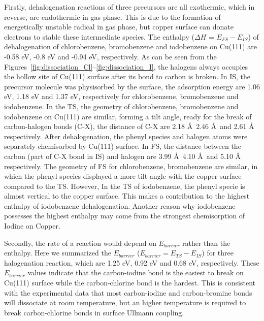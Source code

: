 \documentclass[%
 reprint,
 amsmath,amssymb,
 aps,
prb,
]{revtex4-2}
\begin{document}
Firstly, dehalogenation reactions of three precursors are all exothermic, which in reverse, are endothermic in gas phase. This is due to the formation of energetically unstable radical in gas phase, but copper surface can donate electrons to stable these intermediate species.
The enthalpy ($\Delta H$ = $E_{FS} - E_{IS}$) of dehalogenation of chlorobenzene, bromobenzene and iodobenzene on Cu(111) are -0.58 eV, -0.8 eV and -0.94 eV, respectively. As can be seen from the Figures~\ref{fig:dissociation_Cl}--\ref{fig:dissociation_I}, the halogens always occupies the hollow site of Cu(111) surface after its bond to carbon is broken. 
In IS, the precursor molecule was physisorbed by the surface, the adsorption energy are 1.06 eV, 1.18 eV and 1.37 eV, respectively for chlorobenzene, bromobenzene and iodobenzene. 
%
In the TS, the geometry of chlorobenzene, bromobenzene and iodobenzene on Cu(111) are similar, forming a tilt angle, ready for the break of carbon-halogen bonds (C-X), the distance of C-X are 2.18 \AA\, 2.46 \AA\ and 2.61 \AA\, respectively. 
After dehalogenation, the phenyl species and halogen atoms were separately chemisorbed by Cu(111) surface. In FS, the distance between the carbon (part of C-X bond in IS) and halogen are 3.99 \AA\, 4.10 \AA\ and 5.10 \AA\, respectively. The geometry of FS for chlorobenzene, bromobenzene are similar, in which the phenyl species displayed a more tilt angle with the copper surface compared to the TS. 
However, In the TS of iodobenzene, the phenyl specie is almost vertical to the copper surface. This makes a contribution to the highest enthalpy of iodobenzene dehalogenation. Another reason why iodobenzene possesses the highest enthalpy may come from the strongest chemisorption of Iodine on Copper. 

Secondly, the rate of a reaction would depend on $E_{barrier}$ rather than the enthalpy. Here we summarized the $E_{barrier}$ ($E_{barrier} = E_{TS} - E_{IS}$) for three halogenation reaction, which are 1.25 eV, 0.92 eV and 0.68 eV, respectively. These $E_{barrier}$ values indicate that the carbon-iodine bond is the easiest to break on Cu(111) surface while the carbon-chlorine bond is the hardest. This is consistent with the experimental data that most carbon-iodine and carbon-bromine bonds will dissociate at room temperature, but an higher temperature is required to break carbon-chlorine bonds in surface Ullmann coupling.
\end{document}
